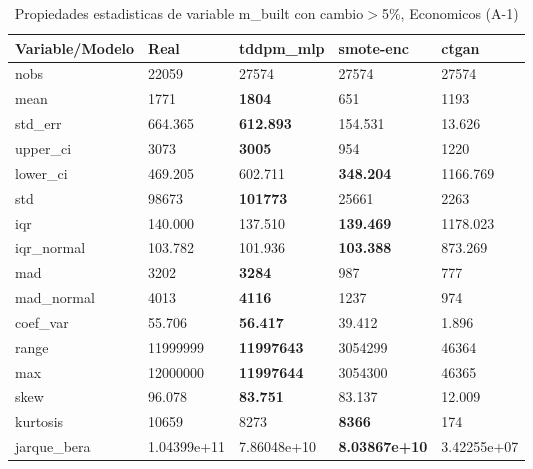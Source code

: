 \begin{table}[H]
\centering
\fontsize{8}{14}\selectfont
\caption{Propiedades estadisticas de variable m\_built con cambio\ensuremath{>}5\%, Economicos (A-1)}
\label{table-stats-economicos-a-1-m_built-short}
\begin{tabular}{|l|m{10em}|m{10em}|m{10em}|m{10em}|}
\hline
 \rowcolor[gray]{0.8}
Variable/Modelo & Real & tddpm\_mlp & smote-enc & ctgan \\
\hline nobs & 22059 & 27574 & 27574 & 27574 \\
\hline mean & 1771 & \bfseries 1804 & \cellcolor[rgb]{0.9, 0.54, 0.52} 651 & 1193 \\
\hline std\_err & 664.365 & \bfseries 612.893 & 154.531 & \cellcolor[rgb]{0.9, 0.54, 0.52} 13.626 \\
\hline upper\_ci & 3073 & \bfseries 3005 & \cellcolor[rgb]{0.9, 0.54, 0.52} 954 & 1220 \\
\hline lower\_ci & 469.205 & 602.711 & \bfseries 348.204 & \cellcolor[rgb]{0.9, 0.54, 0.52} 1166.769 \\
\hline std & 98673 & \bfseries 101773 & 25661 & \cellcolor[rgb]{0.9, 0.54, 0.52} 2263 \\
\hline iqr & 140.000 & 137.510 & \bfseries 139.469 & \cellcolor[rgb]{0.9, 0.54, 0.52} 1178.023 \\
\hline iqr\_normal & 103.782 & 101.936 & \bfseries 103.388 & \cellcolor[rgb]{0.9, 0.54, 0.52} 873.269 \\
\hline mad & 3202 & \bfseries 3284 & 987 & \cellcolor[rgb]{0.9, 0.54, 0.52} 777 \\
\hline mad\_normal & 4013 & \bfseries 4116 & 1237 & \cellcolor[rgb]{0.9, 0.54, 0.52} 974 \\
\hline coef\_var & 55.706 & \bfseries 56.417 & 39.412 & \cellcolor[rgb]{0.9, 0.54, 0.52} 1.896 \\
\hline range & 11999999 & \bfseries 11997643 & 3054299 & \cellcolor[rgb]{0.9, 0.54, 0.52} 46364 \\
\hline max & 12000000 & \bfseries 11997644 & 3054300 & \cellcolor[rgb]{0.9, 0.54, 0.52} 46365 \\
\hline skew & 96.078 & \bfseries 83.751 & 83.137 & \cellcolor[rgb]{0.9, 0.54, 0.52} 12.009 \\
\hline kurtosis & 10659 & 8273 & \bfseries 8366 & \cellcolor[rgb]{0.9, 0.54, 0.52} 174 \\
\hline jarque\_bera & 1.04399e+11 & 7.86048e+10 & \bfseries 8.03867e+10 & \cellcolor[rgb]{0.9, 0.54, 0.52} 3.42255e+07 \\

\end{tabular}
\end{table}
